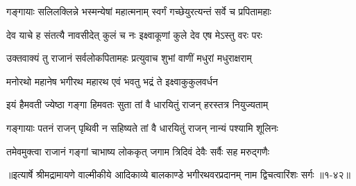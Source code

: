 \twolineshloka
{गङ्गायाः सलिलक्लिन्ने भस्मन्येषां महात्मनाम्}
{स्वर्गं गच्छेयुरत्यन्तं सर्वे च प्रपितामहाः} %

\twolineshloka
{देव याचे ह संतत्यै नावसीदेत् कुलं च नः}
{इक्ष्वाकूणां कुले देव एष मेऽस्तु वरः परः} %

\twolineshloka
{उक्तवाक्यं तु राजानं सर्वलोकपितामहः}
{प्रत्युवाच शुभां वाणीं मधुरां मधुराक्षराम्} %

\twolineshloka
{मनोरथो महानेष भगीरथ महारथ}
{एवं भवतु भद्रं ते इक्ष्वाकुकुलवर्धन} %

\twolineshloka
{इयं हैमवती ज्येष्ठा गङ्गा हिमवतः सुता}
{तां वै धारयितुं राजन् हरस्तत्र नियुज्यताम्} %

\twolineshloka
{गङ्गायाः पतनं राजन् पृथिवी न सहिष्यते}
{तां वै धारयितुं राजन् नान्यं पश्यामि शूलिनः} %

\twolineshloka
{तमेवमुक्त्वा राजानं गङ्गां चाभाष्य लोककृत्}
{जगाम त्रिदिवं देवैः सर्वैः सह मरुद्गणैः} %


॥इत्यार्षे श्रीमद्रामायणे वाल्मीकीये आदिकाव्ये बालकाण्डे भगीरथवरप्रदानम् नाम द्विचत्वारिंशः सर्गः ॥१-४२॥
